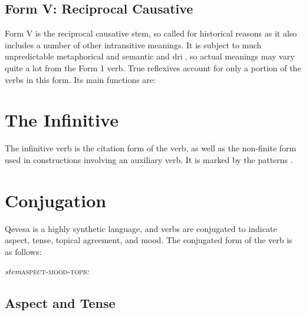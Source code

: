 \documentclass[grammar]{subfiles}
\begin{document}
  \subsection{Form V: Reciprocal Causative}
  \label{ssec:vm_form_v}

   Form V is the reciprocal causative stem, so called for historical reasons as
   it also includes a number of other intransitive meanings.  It is subject to
   much unpredictable metaphorical and semantic and dri, so actual meanings
   may vary quite a lot from the Form 1 verb.  True reflexives account for only
   a portion of the verbs in this form.  Its main functions are:
%   
%   

  \section{The Infinitive}
  \label{sec:vm_infinitive}

  The infinitive verb is the citation form of the verb, as well as the
  non-finite form used in constructions involving an auxiliary verb.  It is
  marked by the patterns .

  \ToBeWritten


  \section{Conjugation}
  \label{sec:vm_conjugation}

  Qevesa is a highly synthetic language, and verbs are conjugated to indicate
  aspect, tense, topical agreement, and mood.  The conjugated form of the verb
  is as follows:

  \begin{exe}
    \ex\label{exe:vm_conjugation} \textit{stem}\bs\textsc{aspect-mood-topic}
  \end{exe}

  \subsection{Aspect and Tense}
  \label{ssec:vm_aspect_tense}
  
  
\end{document}
